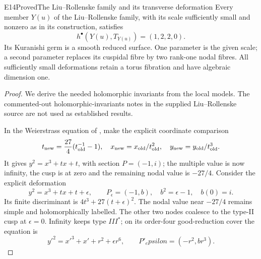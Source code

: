 
\begin{statement}{E14}{Proved}{The Liu--Rollenske family and its transverse deformation}
Every member $Y(u)$ of the Liu--Rollenske family, with its scale
sufficiently small and nonzero as in its construction, satisfies
\[
 h^\bullet(Y(u),T_{Y(u)})=(1,2,2,0).
\]
Its Kuranishi germ is a smooth reduced surface. One parameter is
the given scale; a second parameter replaces its cuspidal fibre by
two rank-one nodal fibres. All sufficiently small deformations
retain a torus fibration and have algebraic dimension one.
\end{statement}
\begin{proof}
We derive the needed holomorphic invariants from the local models.
The commented-out holomorphic-invariants notes in the supplied
Liu--Rollenske source are not used as established results.

In the Weierstrass equation of \cite[Proposition labelled
\texttt{prop: surface facts}]{LiuRollenske2026}, make the explicit
coordinate comparison
\[
 t_{\rm new}=\frac{27}{4}(t_{\rm old}^{-1}-1),\quad
 x_{\rm new}=x_{\rm old}/t_{\rm old}^2,\quad
 y_{\rm new}=y_{\rm old}/t_{\rm old}^3.
\]
It gives $y^2=x^3+tx+t$, with section $P=(-1,i)$; the multiple
value is now infinity, the cusp is at zero and the remaining nodal
value is $-27/4$. Consider the explicit deformation
\begin{equation}\label{eq:E14-elliptic-family}
 y^2=x^3+tx+t+\epsilon,\qquad
 P_\epsilon=(-1,b),\quad b^2=\epsilon-1,
 \quad b(0)=i.
\end{equation}
Its finite discriminant is $4t^3+27(t+\epsilon)^2$.
The nodal value near $-27/4$ remains simple and holomorphically
labelled. The other two nodes coalesce to the type-II cusp at
$\epsilon=0$. Infinity keeps type $III^*$; on its order-four
good-reduction cover the equation is
\[
 y'^2=x'^3+x'+r^2+\epsilon r^6,
 \qquad P'_epsilon=(-r^2,br^3).
\]


\end{proof}
